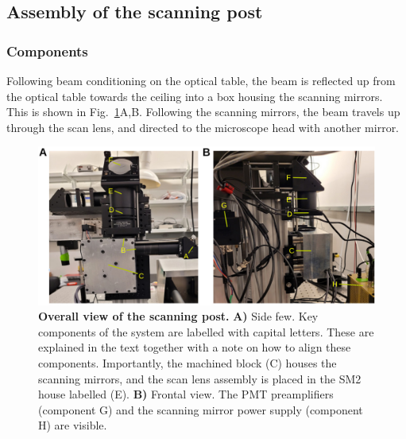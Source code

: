 \documentclass[10pt,letterpaper]{article}
\begin{document}
\subsection{Assembly of the scanning post}

\subsubsection{Components}

Following beam conditioning on the optical table, the beam is reflected up from the optical table towards the ceiling into a box housing the scanning mirrors. This is shown in Fig.~\ref{sfig4}A,B. Following the scanning mirrors, the beam travels up through the scan lens, and directed to the microscope head with another mirror.
%
\begin{figure}[h]
    \includegraphics[width=\textwidth]{sfig4.jpg}
    \caption{{\bf Overall view of the scanning post.} \textbf{A)} Side few. Key components of the system are labelled with capital letters. These are explained in the text together with a note on how to align these components. Importantly, the machined block (C) houses the scanning mirrors, and the scan lens assembly is placed in the SM2 house labelled (E). \textbf{B)} Frontal view. The PMT preamplifiers (component G) and the scanning mirror power supply (component H) are visible.}
    \label{sfig4}
\end{figure}
%
%
\end{document}
